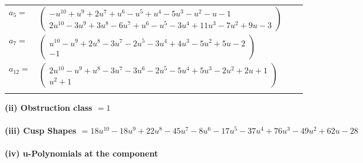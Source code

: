 \documentclass[1p]{elsarticle_modified}
\theoremstyle{definition}
\begin{document}
\begin{tabular}{m{7pt} m{180pt} m{7pt} m{180pt} }
\flushright $a_{5}=$&$\begin{pmatrix}- u^{10}+u^9+2 u^7+u^6- u^5+u^4-5 u^3- u^2- u-1\\2 u^{10}-3 u^9+3 u^8-6 u^7+u^6- u^5-3 u^4+11 u^3-7 u^2+9 u-3\end{pmatrix}$ \\
\flushright $a_{7}=$&$\begin{pmatrix}u^{10}- u^9+2 u^8-3 u^7-2 u^5-3 u^4+4 u^3-5 u^2+5 u-2\\-1\end{pmatrix}$ \\
\flushright $a_{12}=$&$\begin{pmatrix}2 u^{10}- u^9+u^8-3 u^7-3 u^6-2 u^5-5 u^4+5 u^3-2 u^2+2 u+1\\u^2+1\end{pmatrix}$\\&\end{tabular}
\flushleft \textbf{(ii) Obstruction class $= 1$}\\~\\
\flushleft \textbf{(iii) Cusp Shapes $= 18 u^{10}-18 u^9+22 u^8-45 u^7-8 u^6-17 u^5-37 u^4+76 u^3-49 u^2+62 u-28$}\\~\\
\newpage\renewcommand{\arraystretch}{1}
\flushleft \textbf{(iv) u-Polynomials at the component}\newline \\
\end{document}
